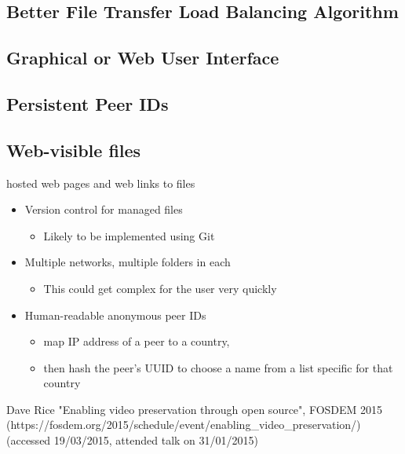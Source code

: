 \documentclass[12pt,a4paper,]{adreport}
\begin{document}
\subsection{Better File Transfer Load Balancing
Algorithm}\label{better-file-transfer-load-balancing-algorithm}

\subsection{Graphical or Web User
Interface}\label{graphical-or-web-user-interface}

\subsection{Persistent Peer IDs}\label{persistent-peer-ids}

\subsection{Web-visible files}\label{web-visible-files}

hosted web pages and web links to files

\begin{itemize}
\itemsep1pt\parskip0pt
\item
  Version control for managed files

  \begin{itemize}
  \itemsep1pt\parskip0pt
  \item
    Likely to be implemented using Git
  \end{itemize}
\item
  Multiple networks, multiple folders in each

  \begin{itemize}
  \itemsep1pt\parskip0pt
  \item
    This could get complex for the user very quickly
  \end{itemize}
\item
  Human-readable anonymous peer IDs

  \begin{itemize}
  \itemsep1pt\parskip0pt
  \item
    map IP address of a peer to a country,
  \item
    then hash the peer's UUID to choose a name from a list specific for
    that country
  \end{itemize}
\end{itemize}

\begin{thebibliography}{9}

 Dave Rice "Enabling video preservation through open source", FOSDEM 2015 (https://fosdem.org/2015/schedule/event/enabling\_video\_preservation/) (accessed 19/03/2015, attended talk on 31/01/2015)

\end{thebibliography}
\end{document}
